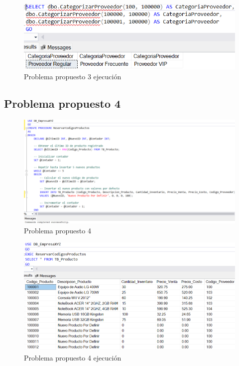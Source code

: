 \begin{figure}[H]
  \centering
  \includegraphics[scale = 0.5]{Imagenes/probs_propuestos/pp3_exe.png}
  \caption{Problema propuesto 3 ejecución}
\end{figure}

\subsection{Problema propuesto 4}

\begin{figure}[H]
  \centering
  \includegraphics[scale = 0.4]{Imagenes/probs_propuestos/pp4.png}
  \caption{Problema propuesto 4}
\end{figure}

\begin{figure}[H]
  \centering
  \includegraphics[scale = 0.5]{Imagenes/probs_propuestos/pp4_exe.png}
  \caption{Problema propuesto 4 ejecución}
\end{figure}